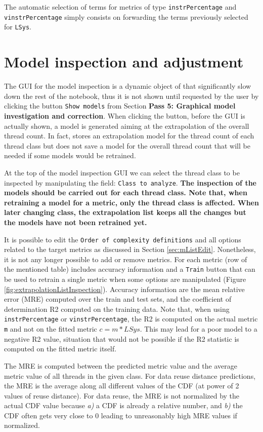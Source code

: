 \documentclass[a4paper, 10pt]{article}
\begin{document}
The automatic selection of terms for metrics of type \verb!instrPercentage! and \verb!vinstrPercentage! simply consists on forwarding the
terms previously selected for \verb!LSys!.

\section{Model inspection and adjustment}
\label{sec:inspection}

The GUI for the model inspection is a dynamic object of \mathe that significantly slow down the rest of the notebook,
thus it is not shown until requested by the user by clicking the button \verb!Show models! from Section
\textbf{Pass 5: Graphical model investigation and correction}.
When clicking the button, before the GUI is actually shown, a model is generated aiming at the extrapolation of the overall thread count.
In fact, \ex stores an extrapolation model for the thread count of each thread class but does not save a model for the overall thread count that
will be needed if some models would be retrained.

At the top of the model inspection GUI we can select the thread class to be inspected by manipulating the field: \verb!Class to analyze!.
\textbf{The inspection of the models should be carried out for each thread class. Note that, when retraining a model for a metric,
only the thread class is affected. When later changing class, the extrapolation list keeps all the changes but the models have not been retrained yet.}

It is possible to edit the \verb!Order of complexity definitions! and
all options related to the target metrics as discussed in Section \ref{sec:mListEdit}. Nonetheless, it is not any longer possible to add or remove
metrics. For each metric (row of the mentioned table) \ex includes accuracy information and a \verb!Train! button that can be used to retrain a 
single metric when some options are manipulated (Figure \ref{fig:extrapolationListInspection}).
Accuracy information are the mean relative error (MRE) computed over the train and test sets, and the coefficient of determination R2
computed on the training data. Note that, when using \texttt{instrPercentage} or \texttt{vinstrPercentage}, the R2 is computed on the actual
metric \texttt{m} and not on the fitted metric $c=m*LSys$. This may lead for a poor model to a negative R2 value, situation that would
not be possible if the R2 statistic is computed on the fitted metric itself.

The MRE is computed between the predicted metric value and the average metric value of all threads in the given class. For data reuse distance
predictions, the MRE is the average along all different values of the CDF (at power of 2 values of reuse distance). For data reuse, the MRE
is not normalized by the actual CDF value because \textit{a)} a CDF is already a relative number, and \textit{b)} the CDF often gets very close to 0
leading to unreasonably high MRE values if normalized.
\end{document}
